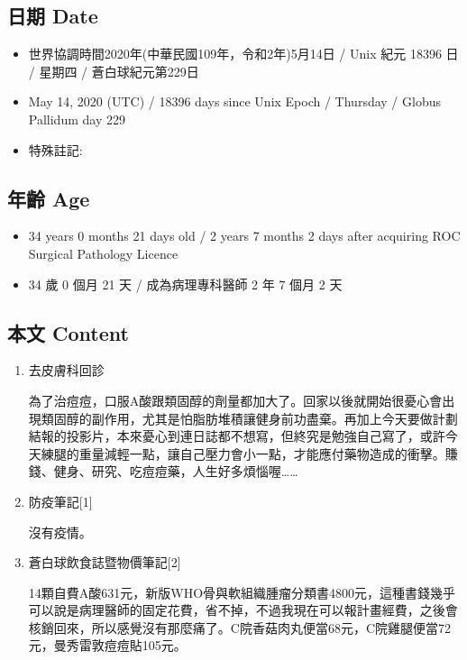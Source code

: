 \documentclass[a5paper, 12pt
]{book}
\providecommand{\tightlist}{%
  \setlength{\itemsep}{0pt}\setlength{\parskip}{0pt}}
\begin{document}
\hypertarget{ux65e5ux671f-date-74}{%
\subsection{日期 Date}\label{ux65e5ux671f-date-74}}

\begin{itemize}
\tightlist
\item
  世界協調時間2020年(中華民國109年，令和2年)5月14日 / Unix 紀元 18396 日
  / 星期四 / 蒼白球紀元第229日
\item
  May 14, 2020 (UTC) / 18396 days since Unix Epoch / Thursday / Globus
  Pallidum day 229
\item
  特殊註記:
\end{itemize}

\hypertarget{ux5e74ux9f61-age-74}{%
\subsection{年齡 Age}\label{ux5e74ux9f61-age-74}}

\begin{itemize}
\tightlist
\item
  34 years 0 months 21 days old / 2 years 7 months 2 days after
  acquiring ROC Surgical Pathology Licence
\item
  34 歲 0 個月 21 天 / 成為病理專科醫師 2 年 7 個月 2 天
\end{itemize}

\hypertarget{ux672cux6587-content-74}{%
\subsection{本文 Content}\label{ux672cux6587-content-74}}

\begin{enumerate}
\def\labelenumi{\arabic{enumi}.}
\item
  去皮膚科回診

  為了治痘痘，口服A酸跟類固醇的劑量都加大了。回家以後就開始很憂心會出現類固醇的副作用，尤其是怕脂肪堆積讓健身前功盡棄。再加上今天要做計劃結報的投影片，本來憂心到連日誌都不想寫，但終究是勉強自己寫了，或許今天練腿的重量減輕一點，讓自己壓力會小一點，才能應付藥物造成的衝擊。賺錢、健身、研究、吃痘痘藥，人生好多煩惱喔\ldots\ldots{}
\item
  防疫筆記{[}1{]}

  沒有疫情。
\item
  蒼白球飲食誌暨物價筆記{[}2{]}

  14顆自費A酸631元，新版WHO骨與軟組織腫瘤分類書4800元，這種書錢幾乎可以說是病理醫師的固定花費，省不掉，不過我現在可以報計畫經費，之後會核銷回來，所以感覺沒有那麼痛了。C院香菇肉丸便當68元，C院雞腿便當72元，曼秀雷敦痘痘貼105元。
\end{enumerate}
\end{document}

